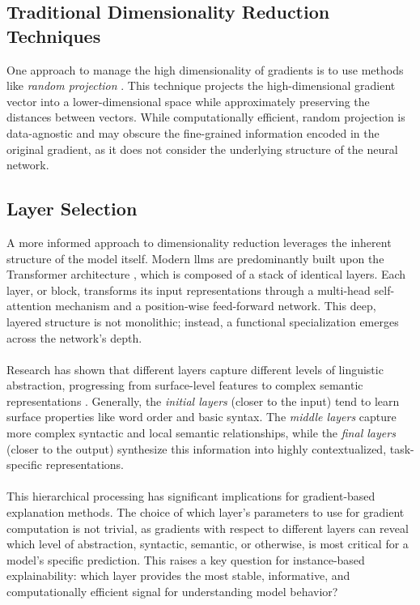 \subsection{Traditional Dimensionality Reduction Techniques}
One approach to manage the high dimensionality of gradients is to use methods like \textit{random projection} \cite{johnson_lindenstrauss}. This technique projects the high-dimensional gradient vector into a lower-dimensional space while approximately preserving the distances between vectors. While computationally efficient, random projection is data-agnostic and may obscure the fine-grained information encoded in the original gradient, as it does not consider the underlying structure of the neural network.

\subsection{Layer Selection}
A more informed approach to dimensionality reduction leverages the inherent structure of the model itself. Modern \acrshort{llm}s are predominantly built upon the Transformer architecture \cite{DBLP:conf/nips/VaswaniSPUJGKP17}, which is composed of a stack of identical layers. Each layer, or block, transforms its input representations through a multi-head self-attention mechanism and a position-wise feed-forward network. This deep, layered structure is not monolithic; instead, a functional specialization emerges across the network's depth.
\\\\
Research has shown that different layers capture different levels of linguistic abstraction, progressing from surface-level features to complex semantic representations \cite{DBLP:conf/acl/TenneyDP19, DBLP:conf/acl/JawaharSS19}. Generally, the \textit{initial layers} (closer to the input) tend to learn surface properties like word order and basic syntax. The \textit{middle layers} capture more complex syntactic and local semantic relationships, while the \textit{final layers} (closer to the output) synthesize this information into highly contextualized, task-specific representations.
\\\\
This hierarchical processing has significant implications for gradient-based explanation methods. The choice of which layer's parameters to use for gradient computation is not trivial, as gradients with respect to different layers can reveal which level of abstraction, syntactic, semantic, or otherwise, is most critical for a model's specific prediction. This raises a key question for instance-based explainability: which layer provides the most stable, informative, and computationally efficient signal for understanding model behavior?

